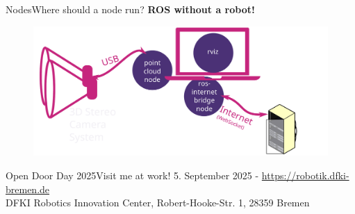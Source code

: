 \documentclass[aspectratio=169]{beamer}
\begin{document}
  \begin{frame}[plain]{Nodes}{Where should a node run?}
    \textbf{ROS without a robot!}
      \begin{figure}[tbh!]
        \centering
        \includegraphics[width=.9\textwidth]{./figures/ros_nodes_example_3.pdf}
      \end{figure}

  \end{frame}



\begin{frame}{Open Door Day 2025}{Visit me at work!}
    5. September 2025 - \url{https://robotik.dfki-bremen.de}\\
    DFKI Robotics Innovation Center, Robert-Hooke-Str. 1, 28359 Bremen
\end{frame}
\end{document}
